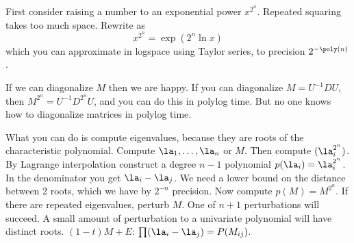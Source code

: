First consider raising a number to an exponential power $x^{2^n}$. Repeated squaring takes too much space. Rewrite as
\[
x^{2^n} = \exp(2^n\ln x)
\]
which you can approximate in logspace using Taylor series, to precision $2^{-\poly(n)}$. 

If we can diagonalize $M$ then we are happy.
If you can diagonalize $M=U^{-1}DU$, then $M^{2^n}=U^{-1}D^{2^n}U$, and you can do this in polylog time. But no one knows how to diagonalize matrices in polylog time.

What you can do is compute eigenvalues, because they are roots of the characteristic polynomial. Compute $\la_1,\ldots, \la_n$ or $M$. 
Then compute $(\la_i^{2^n})$. By Lagrange interpolation construct a degree $n-1$ polynomial $p(\la_i)= \la_i^{2^n}$.
In the denominator you get $\la_i-\la_j$. We need a lower bound on the distance between 2 roots, which we have by $2^{-n}$ precision. Now compute $p(M)=M^{2^n}$.
If there are repeated eigenvalues, perturb $M$. One of $n+1$ perturbations will succeed. A small amount of perturbation to a univariate polynomial will have distinct roots. $(1-t)M+E$: $\prod (\la_i-\la_j)=P(M_{ij})$. 

%
%
